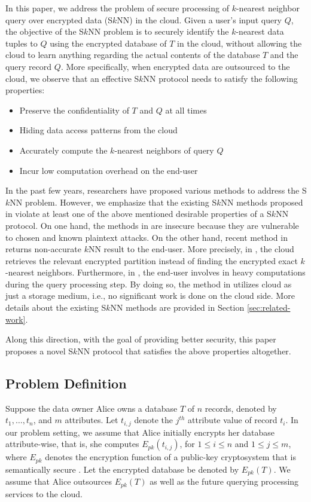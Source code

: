 \documentclass{article}
\begin{document}
In this paper, we address the problem of secure processing 
of $k$-nearest neighbor query over encrypted data (S$k$NN) in the cloud. 
Given a user's input query $Q$, the objective of the S$k$NN problem is to securely 
identify the $k$-nearest data tuples to $Q$ using the encrypted database of 
$T$ in the cloud, without allowing the cloud to learn anything regarding the actual contents of 
the database $T$ and the query record $Q$.
More specifically, when encrypted data are outsourced to the cloud, we observe that 
an effective S$k$NN protocol needs to satisfy the following properties: 
\begin{itemize}\itemsep=0pt
\item Preserve the confidentiality of $T$ and $Q$ at all times
\item Hiding data access patterns from the cloud
\item Accurately compute the $k$-nearest neighbors of query $Q$
\item Incur low computation overhead on the end-user
 \end{itemize}
In the past few years, researchers have proposed various methods \cite{wong2009secure,hu2011processing,yaosecure} to 
address the S$k$NN problem. However, we emphasize that the 
existing S$k$NN methods proposed in \cite{wong2009secure,hu2011processing} violate at 
least one of the above mentioned desirable properties of a S$k$NN protocol.
On one hand, the methods in \cite{wong2009secure,hu2011processing} are insecure because they 
are vulnerable to chosen and known plaintext attacks. 
On the other hand, recent method in \cite{yaosecure} returns non-accurate 
$k$NN result to the end-user. More precisely, in \cite{yaosecure}, the cloud retrieves the relevant encrypted 
partition instead of finding the encrypted exact $k$-nearest neighbors. Furthermore, in 
\cite{hu2011processing,yaosecure}, the end-user involves in heavy computations during the query processing step. 
By doing so, the method in \cite{yaosecure} utilizes cloud as just a storage medium, i.e., no significant 
work is done on the cloud side.   
More details about the existing S$k$NN methods are provided in Section \ref{sec:related-work}. 

Along this direction, with the goal of providing better security, this paper proposes a 
novel S$k$NN protocol that satisfies the above properties altogether. 
\subsection{Problem Definition}\label{sec:problemfor}
Suppose the data owner Alice owns a database $T$ of 
$n$ records, denoted by $t_1, \ldots, t_n$,  
and $m$ attributes. Let
$t_{i,j}$ denote the $j^{th}$ attribute value of record $t_i$. In our problem setting, we 
assume that Alice 
initially encrypts her database attribute-wise, that is, 
she computes $E_{pk}(t_{i,j})$, for $1 \le i \le n$ and $1 \le j \le m$, where $E_{pk}$ denotes the encryption 
function of a public-key cryptosystem that is semantically 
secure \cite{paillier-99}. Let the encrypted database be denoted by $E_{pk}(T)$. We assume 
that Alice outsources $E_{pk}(T)$ as well as the future querying processing services to the cloud.
\end{document}
